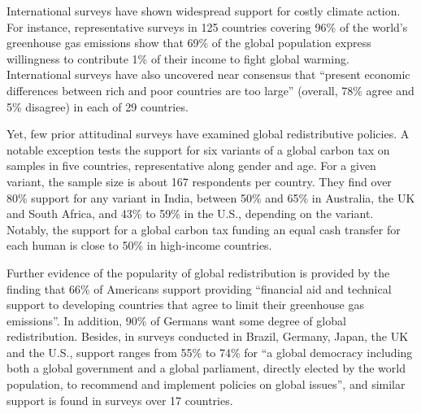 International surveys have shown widespread support for costly climate action.\citep{dechezlepretre_fighting_nodate,leiserowitz_international_2022} For instance, representative surveys in 125 countries covering 96\% of the world's greenhouse gas emissions show that 69\% of the global population express willingness to contribute 1\% of their income to fight global warming.\cite{andre_globally_2024} International surveys have also uncovered near consensus that ``present economic differences between rich and poor countries are too large'' (overall, 78\% agree and 5\% disagree) in each of 29 countries.\citep{issp_international_2019} 

Yet, few prior attitudinal surveys have examined global redistributive policies. 
A notable exception tests the support for six variants of a global carbon tax on samples in five countries, representative along gender and age.\cite{carattini_how_2019} For a given variant, the sample size is about 167 respondents per country. They find over 80\% support for any variant in India, between 50\% and 65\% in Australia, the UK and South Africa, and 43\% to 59\% in the U.S., depending on the variant. Notably, the support for a global carbon tax funding an equal cash transfer for each human is close to 50\% in high-income countries. %

Further evidence of the popularity of global redistribution is provided by the finding that 66\% of Americans support providing ``financial aid and technical support to developing countries that agree to limit their greenhouse gas emissions''.\cite{leiserowitz_public_2021} In addition, 90\% of Germans want some degree of global redistribution.\cite{fehr_your_2022} 
Besides, in surveys conducted in Brazil, Germany, Japan, the UK and the U.S., support ranges from 55\% to 74\% for ``a global democracy including both a global government and a global parliament, directly elected by the world population, to recommend and implement policies on global issues'', and similar support is found in surveys over 17 countries.\cite{ghassim_who_2020,ghassim_who_2024} %

